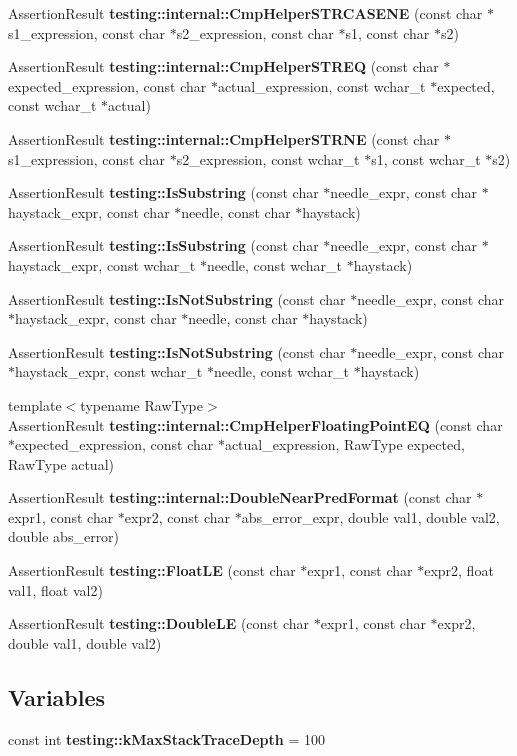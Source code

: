 \begin{CompactItemize}
\item 
AssertionResult {\bf testing::internal::CmpHelperSTRCASENE} (const char $\ast$s1\_\-expression, const char $\ast$s2\_\-expression, const char $\ast$s1, const char $\ast$s2)
\item 
AssertionResult {\bf testing::internal::CmpHelperSTREQ} (const char $\ast$expected\_\-expression, const char $\ast$actual\_\-expression, const wchar\_\-t $\ast$expected, const wchar\_\-t $\ast$actual)
\item 
AssertionResult {\bf testing::internal::CmpHelperSTRNE} (const char $\ast$s1\_\-expression, const char $\ast$s2\_\-expression, const wchar\_\-t $\ast$s1, const wchar\_\-t $\ast$s2)
\item 
AssertionResult {\bf testing::IsSubstring} (const char $\ast$needle\_\-expr, const char $\ast$haystack\_\-expr, const char $\ast$needle, const char $\ast$haystack)
\item 
AssertionResult {\bf testing::IsSubstring} (const char $\ast$needle\_\-expr, const char $\ast$haystack\_\-expr, const wchar\_\-t $\ast$needle, const wchar\_\-t $\ast$haystack)
\item 
AssertionResult {\bf testing::IsNotSubstring} (const char $\ast$needle\_\-expr, const char $\ast$haystack\_\-expr, const char $\ast$needle, const char $\ast$haystack)
\item 
AssertionResult {\bf testing::IsNotSubstring} (const char $\ast$needle\_\-expr, const char $\ast$haystack\_\-expr, const wchar\_\-t $\ast$needle, const wchar\_\-t $\ast$haystack)
\item 
{\footnotesize template$<$typename RawType$>$ }\\AssertionResult {\bf testing::internal::CmpHelperFloatingPointEQ} (const char $\ast$expected\_\-expression, const char $\ast$actual\_\-expression, RawType expected, RawType actual)
\item 
AssertionResult {\bf testing::internal::DoubleNearPredFormat} (const char $\ast$expr1, const char $\ast$expr2, const char $\ast$abs\_\-error\_\-expr, double val1, double val2, double abs\_\-error)
\item 
AssertionResult {\bf testing::FloatLE} (const char $\ast$expr1, const char $\ast$expr2, float val1, float val2)
\item 
AssertionResult {\bf testing::DoubleLE} (const char $\ast$expr1, const char $\ast$expr2, double val1, double val2)
\end{CompactItemize}
\subsection*{Variables}
\begin{CompactItemize}
\item 
const int {\bf testing::kMaxStackTraceDepth} = 100
\end{CompactItemize}


